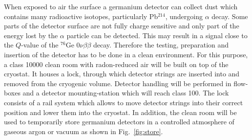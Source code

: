 When exposed to air the surface a germanium detector can collect dust which contains many radioactive isotopes, particularly Pb$^{214}$, undergoing $\alpha$ decay. Some parts of the detector surface are not fully charge sensitive and only part of the energy lost by the $\alpha$ particle can be detected. This may result in a signal close to the $Q$-value of the $^{76}$Ge $0\nu\beta\beta$ decay. Therefore the testing, preparation and insertion of the detector has to be done in a clean environment. For this purpose, a class 10000 clean room with radon-reduced air will be built on top of the cryostat. It houses a lock, through which detector strings are inserted into and removed from the cryogenic volume. Detector handling will be performed in flow-boxes and a detector mounting-station which will reach class 100.  The lock consists of a rail system which allows to move detector strings into their correct position and lower them into the cryostat. In addition, the clean room will be used to temporarily store germanium detectors in a controlled atmosphere of gaseous argon or vacuum as shown in Fig.~\ref{fig:store}.

